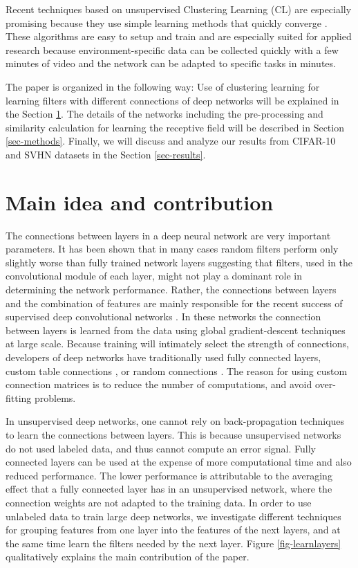 \documentclass{article} %
\begin{document}
Recent techniques based on unsupervised Clustering Learning (CL) are especially promising because they use 
simple learning methods that quickly converge \cite{culurciello2013clustering,coates_analysis_2011}.
These algorithms are easy to setup and train and are especially suited for applied research because environment-specific data 
can be collected quickly with a few minutes of video and the network can be adapted to specific tasks in minutes.

The paper is organized in the following way: 
Use of clustering learning for learning filters with different connections of deep networks will be explained in the Section \ref{sec-main}. 
The details of the networks including the pre-processing and similarity calculation for learning the receptive field will be described in Section \ref{sec-methods}. 
Finally, we will discuss and analyze our results from CIFAR-10 and SVHN datasets in the Section \ref{sec-results}. 


\section{Main idea and contribution}
\label{sec-main}

The connections between layers in a deep neural network are very important parameters.
It has been shown that in many cases random filters perform only slightly worse than fully trained network layers \cite{saxe2011random} suggesting
that filters, used in the convolutional module of each layer, might not play a dominant role in determining the network performance.
Rather, the connections between layers and the combination of features are mainly responsible for the recent success of 
supervised deep convolutional networks \cite{krizhevsky_imagenet_2012}.
In these networks the connection between layers is
learned from the data using global gradient-descent techniques at large scale.
Because training will intimately select the strength of connections, 
developers of deep networks have traditionally used fully connected layers, custom table connections \cite{lecun_gradient-based_1998}, or 
random connections \cite{lecun_convolutional_2010}.
The reason for using custom connection matrices is to reduce the number of computations, and avoid over-fitting problems.
 
In unsupervised deep networks, one cannot rely on back-propagation techniques to learn the connections between layers. 
This is because unsupervised networks do not used labeled data, and thus cannot compute an error signal. 
Fully connected layers can be used \cite{culurciello2013clustering,coates_analysis_2011} at the expense of more computational time and also reduced performance.
The lower performance is attributable to the averaging effect that a fully connected layer has in an unsupervised network, 
where the connection weights are not adapted to the training data.
In order to use unlabeled data to train large deep networks, we investigate different techniques for grouping features from one layer into the features of the next layers, 
and at the same time learn the filters needed by the next layer.
Figure \ref{fig-learnlayers} qualitatively explains the main contribution of the paper.
\end{document}
